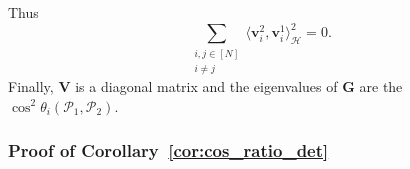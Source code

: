 \documentclass[twoside,11pt]{book}
\numberwithin{theorem}{chapter}
\numberwithin{definition}{chapter}
\numberwithin{proposition}{chapter}
\numberwithin{corollary}{chapter}
\numberwithin{example}{chapter}
\numberwithin{lemma}{chapter}
\numberwithin{assumption}{chapter}
\begin{document}
Thus
\begin{equation}
\sum\limits_{\substack{i,j \in [N]\\ i \neq j}} \langle \bm{v}_{i}^{2}, \bm{v}_{i}^{1}\rangle_{\mathcal{H}}^{2} = 0 .
\end{equation}
Finally, $\bm{V}$ is a diagonal matrix and the eigenvalues of $\bm{G}$ are the $\cos^{2} \theta_{i}(\mathcal{P}_{1},\mathcal{P}_{2})$.


\subsubsection{Proof of Corollary~\ref{cor:cos_ratio_det}}
\end{document}
